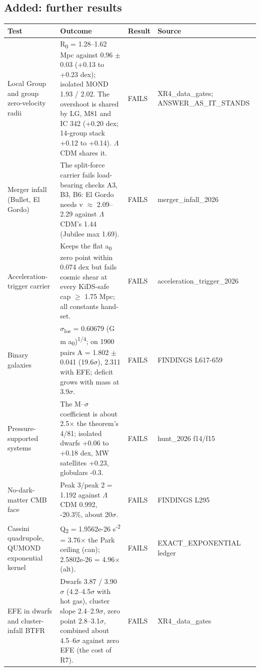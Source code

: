 \documentclass[10pt]{article}
\begin{document}
\subsection*{Added: further results}
{\footnotesize\begin{longtable}{>{\raggedright\arraybackslash}p{4.4cm}>{\raggedright\arraybackslash}p{11.6cm}>{\raggedright\arraybackslash}p{2.0cm}>{\raggedright\arraybackslash}p{3.4cm}}
\toprule\textbf{Test} & \textbf{Outcome} & \textbf{Result} & \textbf{Source}\\\midrule\endhead
Local Group and group zero-velocity radii & R\textsubscript{0} = 1.28--1.62 Mpc against 0.96 \ensuremath{\pm} 0.03 (+0.13 to +0.23 dex); isolated MOND 1.93 / 2.02. The overshoot is shared by LG, M81 and IC 342 (+0.20 dex; 14-group stack +0.12 to +0.14). \ensuremath{\Lambda}CDM shares it. & FAILS & XR4\_data\_gates; ANSWER\_AS\_IT\_STANDS \\
Merger infall (Bullet, El Gordo) & The split-force carrier fails load-bearing checks A3, B3, B6: El Gordo needs v \ensuremath{\approx} 2.09--2.29 against \ensuremath{\Lambda}CDM's 1.44 (Jubilee max 1.69). & FAILS & merger\_infall\_2026 \\
Acceleration-trigger carrier & Keeps the flat a\textsubscript{0} zero point within 0.074 dex but fails cosmic shear at every KiDS-safe cap \ensuremath{\geq} 1.75 Mpc; all constants hand-set. & FAILS & acceleration\_trigger\_2026 \\
Binary galaxies & \ensuremath{\sigma}\textsubscript{los} = 0.60679 (G m a\textsubscript{0})\textsuperscript{1/4}; on 1900 pairs A = 1.802 \ensuremath{\pm} 0.041 (19.6\ensuremath{\sigma}), 2.311 with EFE; deficit grows with mass at 3.9\ensuremath{\sigma}. & FAILS & FINDINGS L617-659 \\
Pressure-supported systems & The M--\ensuremath{\sigma} coefficient is about 2.5\ensuremath{\times} the theorem's 4/81; isolated dwarfs +0.06 to +0.18 dex, MW satellites +0.23, globulars -0.3. & FAILS & hunt\_2026 f14/f15 \\
No-dark-matter CMB face & Peak 3/peak 2 = 1.192 against \ensuremath{\Lambda}CDM 0.992, -20.3\%, about 20\ensuremath{\sigma}. & FAILS & FINDINGS L295 \\
Cassini quadrupole, QUMOND exponential kernel & Q\textsubscript{2} = 1.9562e-26 s\textsuperscript{-2} = 3.76\ensuremath{\times} the Park ceiling (can); 2.5802e-26 = 4.96\ensuremath{\times} (alt). & FAILS & EXACT\_EXPONENTIAL ledger \\
EFE in dwarfs and cluster-infall BTFR & Dwarfs 3.87 / 3.90\ensuremath{\sigma} (4.2--4.5\ensuremath{\sigma} with hot gas), cluster slope 2.4--2.9\ensuremath{\sigma}, zero point 2.8--3.1\ensuremath{\sigma}, combined about 4.5--6\ensuremath{\sigma} against zero EFE (the cost of R7). & FAILS & XR4\_data\_gates \\

\end{longtable}}
\end{document}
